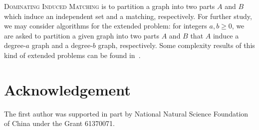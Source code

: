 \documentclass{elsart_TR2}
\begin{document}
\textsc{Dominating Induced Matching} is to partition a graph into two parts $A$ and $B$ which
 induce an independent set and a matching, respectively.
For further study, we may consider algorithms for the extended problem:  for
integers $a,b\geq 0$, we are asked
to partition a given graph into two parts $A$ and $B$   that $A$
   induce a degree-$a$ graph and a degree-$b$ graph, respectively.
Some complexity results of this kind of extended problems can be found in~\cite{xn:BDG}.



\section*{Acknowledgement}
The first author was supported in part by National Natural Science Foundation of China under the Grant
61370071.
\end{document}
